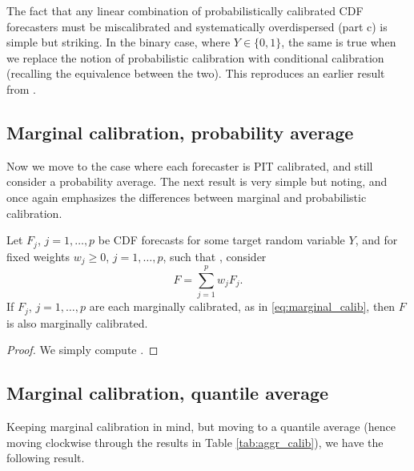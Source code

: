 \documentclass{article}
\begin{document}
The fact that any linear combination of probabilistically calibrated CDF
forecasters must be miscalibrated and systematically overdispersed (part c) is
simple but striking. In the binary case, where $Y \in \{0,1\}$, the same is true
when we replace the notion of probabilistic calibration with conditional
calibration (recalling the equivalence between the two). This reproduces an
earlier result from \citet{ranjan2010combining}.   

\subsection{Marginal calibration, probability average}

Now we move to the case where each forecaster is PIT calibrated, and still
consider a probability average. The next result is very simple but 
noting, and once again emphasizes the differences between marginal and
probabilistic calibration. 

\begin{theorem}
\label{thm:marginal_prob}
Let $F_j$, $j=1,\dots,p$ be CDF forecasts for some target random variable $Y$,
and for fixed weights $w_j \geq 0$, $j=1,\dots,p$, such that
, consider  
\[
F = \sum_{j=1}^p w_j F_j.
\]
If $F_j$, $j=1,\dots,p$ are each marginally calibrated, as in
\eqref{eq:marginal_calib}, then $F$ is also marginally calibrated.  
\end{theorem}

\begin{proof}
We simply compute .
\end{proof}

\subsection{Marginal calibration, quantile average}

Keeping marginal calibration in mind, but moving to a quantile average (hence
moving clockwise through the results in Table \ref{tab:aggr_calib}), we have the
following result. 
\end{document}

